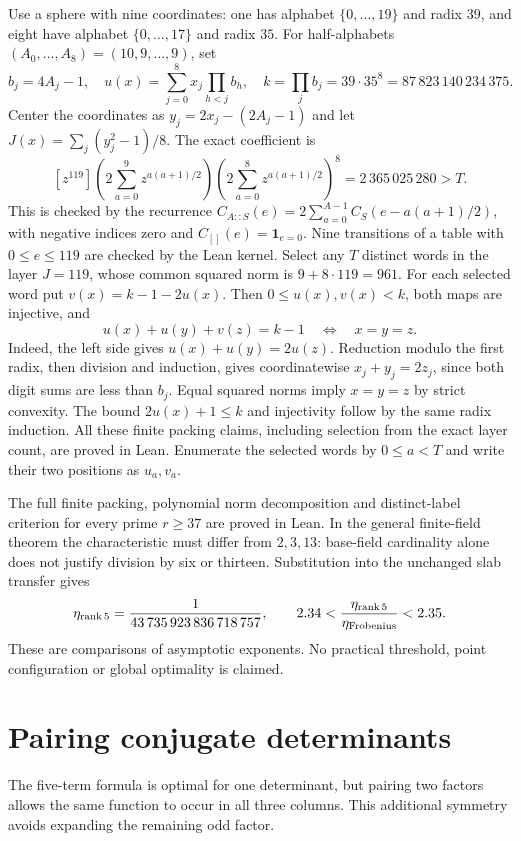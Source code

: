 \documentclass[11pt]{article}
\begin{document}
Use a sphere with nine coordinates: one has alphabet
$\{0,\ldots,19\}$ and radix $39$, and eight have alphabet
$\{0,\ldots,17\}$ and radix $35$. For half-alphabets
$(A_0,\ldots,A_8)=(10,9,\ldots,9)$, set
\[
 b_j=4A_j-1,\quad u(x)=\sum_{j=0}^8 x_j\prod_{h<j}b_h,
 \quad k=\prod_j b_j=39\cdot35^8=87\,823\,140\,234\,375.
\]
Center the coordinates as $y_j=2x_j-(2A_j-1)$ and let
$J(x)=\sum_j (y_j^2-1)/8$. The exact coefficient is
\[
 [z^{119}]\left(2\sum_{a=0}^9z^{a(a+1)/2}\right)
 \left(2\sum_{a=0}^8z^{a(a+1)/2}\right)^8
 =2\,365\,025\,280>T.
\]
This is checked by the recurrence $C_{A::S}(e)=
2\sum_{a=0}^{A-1}C_S(e-a(a+1)/2)$, with negative indices zero
and $C_{[]}(e)=\mathbf1_{e=0}$. Nine transitions of a table with
$0\le e\le119$ are checked by the Lean kernel. Select any $T$ distinct
words in the layer $J=119$, whose common squared norm is $9+8\cdot119=961$.
For each selected word put $v(x)=k-1-2u(x)$. Then
$0\le u(x),v(x)<k$, both maps are injective, and
\[
 u(x)+u(y)+v(z)=k-1\quad\Longleftrightarrow\quad x=y=z.
\]
Indeed, the left side gives $u(x)+u(y)=2u(z)$. Reduction modulo the
first radix, then division and induction, gives coordinatewise
$x_j+y_j=2z_j$, since both digit sums are less than $b_j$.
Equal squared norms imply $x=y=z$ by strict convexity. The bound
$2u(x)+1\le k$ and injectivity follow by the same radix induction.
All these finite packing claims, including selection from the exact
layer count, are proved in Lean. Enumerate the selected words by
$0\le a<T$ and write their two positions as $u_a,v_a$.

The full finite packing, polynomial norm decomposition and distinct-label
criterion for every prime \(r\ge37\) are proved in Lean. In the general
finite-field theorem the characteristic must differ from \(2,3,13\):
base-field cardinality alone does not justify division by six or thirteen.
Substitution into the unchanged slab transfer gives
\[
 \eta_{\rm rank\,5}=\frac{1}{43\,735\,923\,836\,718\,757},\qquad
 2.34<\frac{\eta_{\rm rank\,5}}{\eta_{\rm Frobenius}}<2.35.
\]
These are comparisons of asymptotic exponents. No practical threshold,
point configuration or global optimality is claimed.

\section{Pairing conjugate determinants}\label{sec:paired}
The five-term formula is optimal for one determinant, but pairing two
factors allows the same function to occur in all three columns. This
additional symmetry avoids expanding the remaining odd factor.
\end{document}
